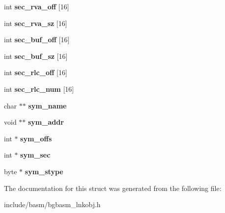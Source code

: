 \begin{DoxyCompactItemize}
\item 
\hypertarget{structBLNK__COFF__Info__s_a438a97f0c77d2ee108153d6487544b1b}{int {\bfseries sec\-\_\-rva\-\_\-off} \mbox{[}16\mbox{]}}\label{structBLNK__COFF__Info__s_a438a97f0c77d2ee108153d6487544b1b}

\item 
\hypertarget{structBLNK__COFF__Info__s_aac747b626f3c65c439d11ba0ef07a32d}{int {\bfseries sec\-\_\-rva\-\_\-sz} \mbox{[}16\mbox{]}}\label{structBLNK__COFF__Info__s_aac747b626f3c65c439d11ba0ef07a32d}

\item 
\hypertarget{structBLNK__COFF__Info__s_a305bd4a2e37e8ccd7dcb12c190ab9fb9}{int {\bfseries sec\-\_\-buf\-\_\-off} \mbox{[}16\mbox{]}}\label{structBLNK__COFF__Info__s_a305bd4a2e37e8ccd7dcb12c190ab9fb9}

\item 
\hypertarget{structBLNK__COFF__Info__s_a0cafec11214daf0aa39dbc5dda0c2806}{int {\bfseries sec\-\_\-buf\-\_\-sz} \mbox{[}16\mbox{]}}\label{structBLNK__COFF__Info__s_a0cafec11214daf0aa39dbc5dda0c2806}

\item 
\hypertarget{structBLNK__COFF__Info__s_ac7fa4585847e3123e54d209f68361d33}{int {\bfseries sec\-\_\-rlc\-\_\-off} \mbox{[}16\mbox{]}}\label{structBLNK__COFF__Info__s_ac7fa4585847e3123e54d209f68361d33}

\item 
\hypertarget{structBLNK__COFF__Info__s_ae78f5e06539158d859262d11063ae350}{int {\bfseries sec\-\_\-rlc\-\_\-num} \mbox{[}16\mbox{]}}\label{structBLNK__COFF__Info__s_ae78f5e06539158d859262d11063ae350}

\item 
\hypertarget{structBLNK__COFF__Info__s_a4735801b87f5bc879862c782ae7446e3}{char $\ast$$\ast$ {\bfseries sym\-\_\-name}}\label{structBLNK__COFF__Info__s_a4735801b87f5bc879862c782ae7446e3}

\item 
\hypertarget{structBLNK__COFF__Info__s_a5fd866bf103110c69fcbf8f1ac553f7a}{void $\ast$$\ast$ {\bfseries sym\-\_\-addr}}\label{structBLNK__COFF__Info__s_a5fd866bf103110c69fcbf8f1ac553f7a}

\item 
\hypertarget{structBLNK__COFF__Info__s_ad3054974adfa44e44999f299263520f0}{int $\ast$ {\bfseries sym\-\_\-offs}}\label{structBLNK__COFF__Info__s_ad3054974adfa44e44999f299263520f0}

\item 
\hypertarget{structBLNK__COFF__Info__s_aef081dfb302f5352e51befd36fd1286d}{int $\ast$ {\bfseries sym\-\_\-sec}}\label{structBLNK__COFF__Info__s_aef081dfb302f5352e51befd36fd1286d}

\item 
\hypertarget{structBLNK__COFF__Info__s_a010dde2d9c91ba15c46f45fb2a486fba}{byte $\ast$ {\bfseries sym\-\_\-stype}}\label{structBLNK__COFF__Info__s_a010dde2d9c91ba15c46f45fb2a486fba}

\end{DoxyCompactItemize}


The documentation for this struct was generated from the following file\-:\begin{DoxyCompactItemize}
\item 
include/basm/bgbasm\-\_\-lnkobj.\-h\end{DoxyCompactItemize}

